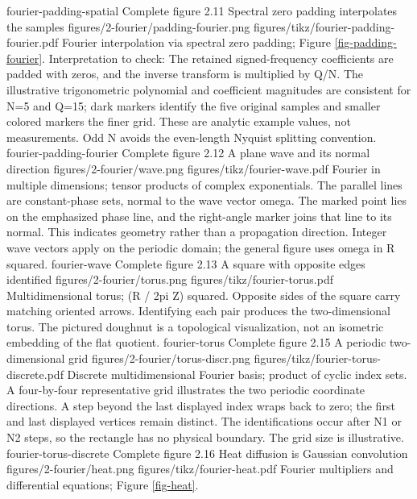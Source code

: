 {fourier-padding-spatial}
{Complete figure}
{2.11}
{Spectral zero padding interpolates the samples}
{figures/2-fourier/padding-fourier.png}
{figures/tikz/fourier-padding-fourier.pdf}
{Fourier interpolation via spectral zero padding; Figure \ref{fig-padding-fourier}.}
{Interpretation to check: The retained signed-frequency coefficients are padded with zeros, and the inverse transform is multiplied by Q/N. The illustrative trigonometric polynomial and coefficient magnitudes are consistent for N=5 and Q=15; dark markers identify the five original samples and smaller colored markers the finer grid. These are analytic example values, not measurements. Odd N avoids the even-length Nyquist splitting convention.}
{fourier-padding-fourier}
{Complete figure}
{2.12}
{A plane wave and its normal direction}
{figures/2-fourier/wave.png}
{figures/tikz/fourier-wave.pdf}
{Fourier in multiple dimensions; tensor products of complex exponentials.}
{The parallel lines are constant-phase sets, normal to the wave vector omega. The marked point lies on the emphasized phase line, and the right-angle marker joins that line to its normal. This indicates geometry rather than a propagation direction. Integer wave vectors apply on the periodic domain; the general figure uses omega in R squared.}
{fourier-wave}
{Complete figure}
{2.13}
{A square with opposite edges identified}
{figures/2-fourier/torus.png}
{figures/tikz/fourier-torus.pdf}
{Multidimensional torus; (R / 2pi Z) squared.}
{Opposite sides of the square carry matching oriented arrows. Identifying each pair produces the two-dimensional torus. The pictured doughnut is a topological visualization, not an isometric embedding of the flat quotient.}
{fourier-torus}
{Complete figure}
{2.15}
{A periodic two-dimensional grid}
{figures/2-fourier/torus-discr.png}
{figures/tikz/fourier-torus-discrete.pdf}
{Discrete multidimensional Fourier basis; product of cyclic index sets.}
{A four-by-four representative grid illustrates the two periodic coordinate directions. A step beyond the last displayed index wraps back to zero; the first and last displayed vertices remain distinct. The identifications occur after N1 or N2 steps, so the rectangle has no physical boundary. The grid size is illustrative.}
{fourier-torus-discrete}
{Complete figure}
{2.16}
{Heat diffusion is Gaussian convolution}
{figures/2-fourier/heat.png}
{figures/tikz/fourier-heat.pdf}
{Fourier multipliers and differential equations; Figure \ref{fig-heat}.}
